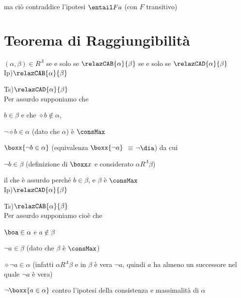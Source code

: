 ma ciò contraddice l'ipotesi $\entail Fa$ (con $F$ transitivo) \lightning\\



\section{$ $Teorema di Raggiungibilità}

$(\alpha,\beta)\in R^{\Lambda}$ se e solo se $\relazCAB{\alpha}{\beta}$
se e solo se \foreignlanguage{english}{$\relazCAD{\alpha}{\beta}$}
\\
Ip)$\relazCAB{\alpha}{\beta}$

Ts)$\relazCAD{\alpha}{\beta}$\\


Per assurdo supponiamo che

$b\in\beta$ e che $\diamond b\notin\alpha$, 

%
$\neg\diamond b\in\alpha$\foreignlanguage{italian}{ (dato che $\alpha$)
è $\consMax$}

%
$\boxx{\neg b\in\alpha}$ (equivalenza $\boxx{\neg a}$ $\equiv$$\neg\dia$)
da cui

$\neg b\in\beta$ (definizione di $\boxx x$ e considerato $\alpha R^{\Lambda}\beta$)

il che è assurdo perché $b\in\beta$, e $\beta$ è $\consMax$\lightning\\


Ip)$\relazCAD{\alpha}{\beta}$

Ts)$\relazCAB{\alpha}{\beta}$\\
Per assurdo supponiamo cioè che

$\boa\in\alpha$ e $a\notin\beta$

$\neg a\in\beta$ (dato che $\beta$ è $\consMax$)

$\diamond\neg a\in\alpha$ (infatti $\alpha R^{\Lambda}\beta$ e in
$\beta$ è vera $\neg a$, quindi $a$ ha almeno un successore nel
quale $\neg a$ è vera)

$\neg\boxx{a\in\alpha}$ contro l'ipotesi della consistenza e massimalità
di $\alpha$\lightning\\



